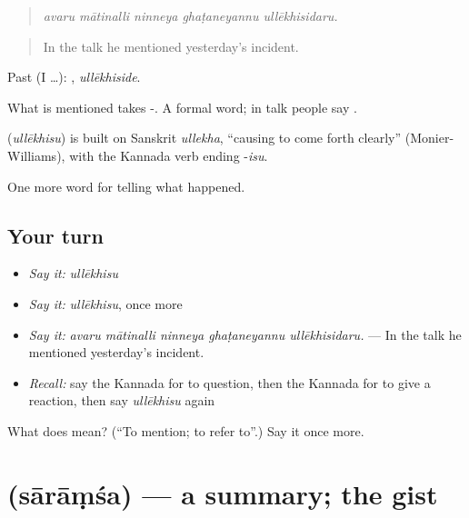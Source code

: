 \begin{quote}
\emph{avaru mātinalli ninneya ghaṭaneyannu ullēkhisidaru.}
\end{quote}

\begin{quote}
In the talk he mentioned yesterday's incident.
\end{quote}

Past (I …): , \emph{ullēkhiside}.

What is mentioned takes -. A formal word; in talk people say .

\begin{cousinweb}
\textbf{} (\emph{ullēkhisu}) is built on Sanskrit \emph{ullekha}, \textquotedblleft{}causing to come forth clearly\textquotedblright{} (Monier-Williams), with the Kannada verb ending -\emph{isu}.
\end{cousinweb}

\begin{grammarlens}[title={What you've built}]
One more word for telling what happened.
\end{grammarlens}

\subsection*{Your turn}
\begin{itemize}
\raggedright
  \item \emph{Say it:} \emph{ullēkhisu}
  \item \emph{Say it:} \emph{ullēkhisu}, once more
  \item \emph{Say it:} \emph{avaru mātinalli ninneya ghaṭaneyannu ullēkhisidaru.} — In the talk he mentioned yesterday's incident.
  \item \emph{Recall:} say the Kannada for to question, then the Kannada for to give a reaction, then say \emph{ullēkhisu} again
\end{itemize}

\begin{tcolorbox}[breakable,colback=teal!4,colframe=teal!35!black,title={Before you move on}]
What does  mean? (\textquotedblleft{}To mention; to refer to\textquotedblright{}.) Say it once more.
\end{tcolorbox}
\section[\texorpdfstring{\kn{ಸಾರಾಂಶ} (sārāṃśa)}{ಸಾರಾಂಶ (sārāṃśa)}]{ (sārāṃśa) — a summary; the gist}

